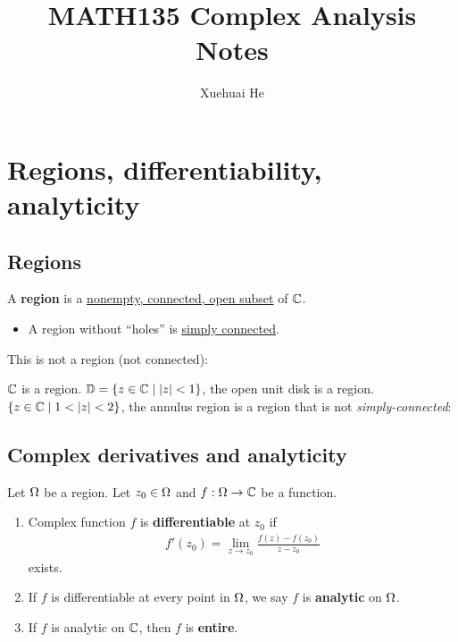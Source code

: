 \documentclass[12pt]{article}
\begin{document}
\title{MATH135 Complex Analysis Notes}
\author{Xuehuai He}
\maketitle

\hypertarget{toc}{}
{\parskip=0.05in
\tableofcontents}

\spl

\newpage
\pagestyle{updated}

\section{Regions, differentiability, analyticity}

\subsection{Regions}
 A \textbf{region} is a \uline{nonempty, connected, open subset} of $\mathbb{C}$.
\begin{itemize}
    \item A region without ``holes'' is \uline{simply connected}.
\end{itemize}

\noneg This is not a region (not connected): 
\[\]

\eg $\mathbb{C}$ is a region.
\eg $\mathbb{D} = \{z\in \mathbb{C}\mid |z|<1\}$, the open unit disk is a region.
\eg $\{z\in \C \mid 1<|z|<2\}$, the annulus region is a region that is not \textit{simply-connected}:
{\def\svgwidth{80pt}
\[\]}

\subsection{Complex derivatives and analyticity}

 Let $\Omega$ be a region. Let $z_0\in \Omega$ and $f:\Omega \to \mathbb{C}$ be a function.
\begin{enumerate}
    \item Complex function $f$ is \textbf{differentiable} at $z_0$ if \begin{align*}
        f'(z_0)=\lim_{z\to z_0}\frac{f(z)-f(z_0)}{z-z_0}
    \end{align*}
    exists.

    \item If $f$ is differentiable at every point in $\Omega$, we say $f$ is \textbf{analytic} on $\Omega$.
    \item If $f$ is analytic on $\mathbb{C}$, then $f$ is \textbf{entire}.
\end{enumerate}
\end{document}
